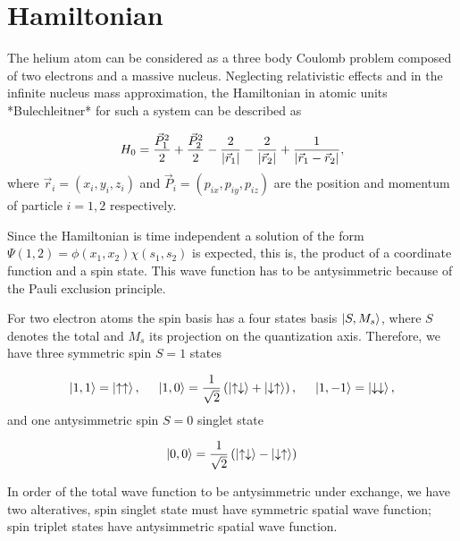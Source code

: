 \section{Hamiltonian}

The helium atom can be considered as a three body Coulomb problem composed of two electrons and a massive nucleus. Neglecting relativistic effects and in the infinite nucleus mass approximation, the Hamiltonian in atomic units *Bulechleitner* for such a system can be described as  


\begin{equation}
H_{0}=\frac{\vec{P}_{1}^{2}}{2}+\frac{\vec{P}_{2}^{2}}{2}-\frac{2}{\abs{\vec{r}_{1}}}-\frac{2}{\abs{\vec{r}_{2}}}+\frac{1}{\abs{\vec{r}_{1}-\vec{r}_{2}}},
\end{equation} \label{eq:hamiltonian}
where $ \vec{r}_{i}=(x_{i},y_{i},z_{i}) $ and $ \vec{P}_{i}=(p_{ix},p_{iy},p_{iz}) $ are the position and momentum of particle $ i=1,2 $ respectively. 

Since the Hamiltonian is time independent a solution of the form $ \Psi(1,2)=\phi(x_{1},x_{2}) \chi(s_{1},s_{2}) $ is expected, this is, the product of a coordinate function and a spin state. This wave function has to be antysimmetric because of the Pauli exclusion principle. 

For two electron atoms the spin basis has a four states basis $ \ket{S, M_{s}} $, where $ S $ denotes the total and $ M_{s} $ its projection on the quantization axis. Therefore, we have  three symmetric spin $ S=1 $ states

\begin{equation}
	\ket{1,1}=\ket{\uparrow\uparrow}, \hspace{0.5cm} \ket{1,0}=\frac{1}{\sqrt{2}} \left(\ket{\uparrow\downarrow}+\ket{\downarrow\uparrow}\right), \hspace{0.5cm} \ket{1,-1}=\ket{\downarrow\downarrow},
\end{equation}
and one antysimmetric spin $ S=0 $ singlet state

\begin{equation}
\ket{0,0}=\frac{1}{\sqrt{2}} \left(\ket{\uparrow\downarrow}-\ket{\downarrow\uparrow}\right)
\end{equation}

In order of the total wave function to be antysimmetric under exchange, we have two alteratives, spin singlet state must have symmetric spatial wave function; spin triplet states have antysimmetric spatial wave function.

